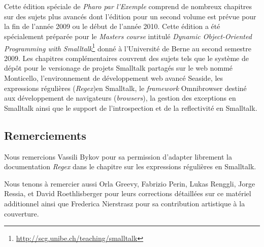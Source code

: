 \documentclass[a4paper,10pt,twoside]{book}
\begin{document}
	\sloppy
	\frontmatter
\fi
\chapter{}
\newcommand{\web}{web\xspace}
\newcommand{\framework}{\emph{framework}\xspace}

Cette édition spéciale de \emph{Pharo par l'Exemple} comprend de
nombreux chapitres sur des sujets plus avancés
dont l'édition pour un second volume est prévue pour la fin de l'année
2009 ou le début de l'année 2010.
Cette édition a été spécialement préparée pour le 
\emph{Masters course} intitulé \emph{Dynamic Object-Oriented
  Programming with
  Smalltalk}\footnote{\url{http://scg.unibe.ch/teaching/smalltalk}}
donné à l'Université de Berne au second semestre 2009.
Les chapitres complémentaires couvrent des sujets tels que le système
de dépôt pour le versionage de projets Smalltalk partagés sur le \web
nommé Monticello,
l'environnement de développement \web avancé Seaside,
les expressions régulières (\emph{Regex})en Smalltalk,
le \framework Omnibrowser destiné aux développement de navigateurs
(\emph{browsers}),
la gestion des exceptions en Smalltalk ainsi que le support de
l'introspection et de la reflectivité en Smalltalk.

\section*{Remerciements}

Nous remercions Vassili Bykov pour sa permission d'adapter librement
la documentation \emph{Regex} dans le chapitre sur les expressions
régulières en Smalltalk.

Nous tenons à remercier aussi
Orla Greevy,
Fabrizio Perin,
Lukas Renggli,
Jorge Ressia,
et
David Roethlisberger
pour leurs corrections détaillées sur ce matériel additionnel
ainsi que Frederica Nierstrasz pour sa contribution 
artistique à la couverture.




\ifx\wholebook\relax\else
   
   
\end{document}
